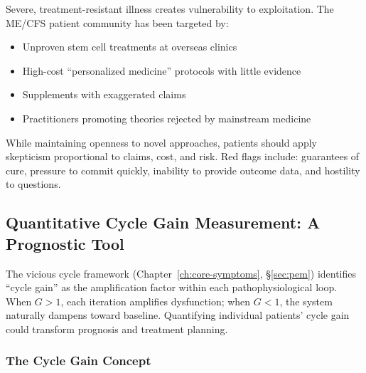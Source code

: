 \begin{observation}
Severe, treatment-resistant illness creates vulnerability to exploitation. The ME/CFS patient community has been targeted by:
\begin{itemize}
    \item Unproven stem cell treatments at overseas clinics
    \item High-cost ``personalized medicine'' protocols with little evidence
    \item Supplements with exaggerated claims
    \item Practitioners promoting theories rejected by mainstream medicine
\end{itemize}
While maintaining openness to novel approaches, patients should apply skepticism proportional to claims, cost, and risk. Red flags include: guarantees of cure, pressure to commit quickly, inability to provide outcome data, and hostility to questions.
\end{observation}

\subsection{Quantitative Cycle Gain Measurement: A Prognostic Tool}
\label{subsec:cycle-gain-measurement}

The vicious cycle framework (Chapter~\ref{ch:core-symptoms}, \S\ref{sec:pem}) identifies ``cycle gain'' as the amplification factor within each pathophysiological loop. When $G > 1$, each iteration amplifies dysfunction; when $G < 1$, the system naturally dampens toward baseline. Quantifying individual patients' cycle gain could transform prognosis and treatment planning.

\subsubsection{The Cycle Gain Concept}

